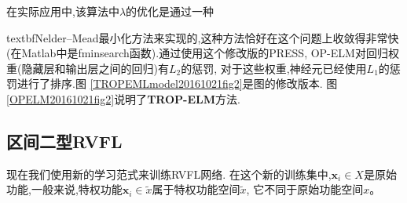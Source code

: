 在实际应用中,该算法中$\lambda$的优化是通过一种{textbf{Nelder–Mead最小化方法}来实现的,这种方法恰好在这个问题上收敛得非常快(在Matlab中是fminsearch函数).通过使用这个修改版的PRESS, OP-ELM对回归权重(隐藏层和输出层之间的回归)有$L_2$的惩罚, 对于这些权重,神经元已经使用$L_1$的惩罚进行了排序.图 \ref{TROPEMLmodel20161021fig2}是图的修改版本. 图\ref{OPELM20161021fig2}说明了\textbf{TROP-ELM}方法.
\subsection{区间二型RVFL}
现在我们使用新的学习范式来训练RVFL网络.
在这个新的训练集中,$\bm x_i\in X$是原始功能,一般来说,特权功能$\bm x_i\in \widetilde x$属于特权功能空间$\widetilde x$, 它不同于原始功能空间$x$。

}
